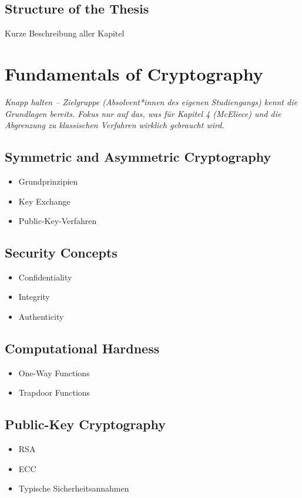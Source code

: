 \documentclass[a4paper,11pt]{article}
\begin{document}
\subsection{Structure of the Thesis}
Kurze Beschreibung aller Kapitel

\section{Fundamentals of Cryptography}
\textit{Knapp halten -- Zielgruppe (Absolvent*innen des eigenen Studiengangs)
kennt die Grundlagen bereits. Fokus nur auf das, was für Kapitel 4
(McEliece) und die Abgrenzung zu klassischen Verfahren wirklich gebraucht
wird.}

\subsection{Symmetric and Asymmetric Cryptography}
\begin{itemize}
	\item Grundprinzipien
	\item Key Exchange
	\item Public-Key-Verfahren
\end{itemize}

\subsection{Security Concepts}
\begin{itemize}
	\item Confidentiality
	\item Integrity
	\item Authenticity
\end{itemize}

\subsection{Computational Hardness}
\begin{itemize}
	\item One-Way Functions
	\item Trapdoor Functions
\end{itemize}

\subsection{Public-Key Cryptography}
\begin{itemize}
	\item RSA
	\item ECC
	\item Typische Sicherheitsannahmen
\end{itemize}
\end{document}
